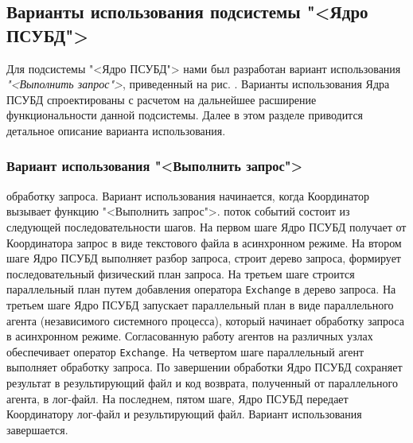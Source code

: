 \documentclass[11pt,oneside]{article}
\begin{document}
	\subsection{Варианты использования подсистемы "<Ядро ПСУБД">}\label{S_KernelUseCases}
	
	
	Для подсистемы "<Ядро ПСУБД"> нами был разработан вариант использования \textit{"<Выполнить запрос">}, приведенный на рис. %
	. Варианты использования Ядра ПСУБД спроектированы с расчетом на дальнейшее расширение функциональности данной подсистемы. Далее в этом разделе приводится детальное описание варианта использования.
	
	\subsubsection{Вариант использования "<Выполнить запрос">}
	 обработку запроса. Вариант использования начинается, когда Координатор вызывает функцию "<Выполнить запрос">.
	 поток событий состоит из следующей последовательности шагов. На первом шаге Ядро ПСУБД получает от Координатора запрос в виде текстового файла в асинхронном режиме. На втором шаге Ядро ПСУБД выполняет разбор запроса, строит дерево запроса, формирует последовательный физический план запроса. На третьем шаге строится параллельный план путем добавления оператора \texttt{Exchange} в дерево запроса. На третьем шаге Ядро ПСУБД запускает параллельный план в виде параллельного агента (независимого системного процесса), который начинает обработку запроса в асинхронном режиме. Согласованную работу агентов на различных узлах обеспечивает оператор \texttt{Exchange}. На четвертом шаге параллельный агент выполняет обработку запроса. По завершении обработки Ядро ПСУБД сохраняет результат в результирующий файл и код возврата, полученный от параллельного агента, в лог-файл.
	На последнем, пятом шаге, Ядро ПСУБД передает Координатору лог-файл и результирующий файл. Вариант использования завершается.
	
\end{document}

